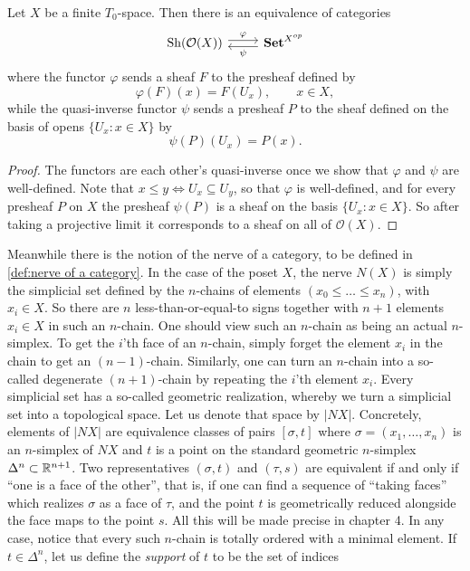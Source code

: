 \begin{theorem}
\label{thm:intro-theorem}
Let $X$ be a finite $T_0$-space. Then there is an equivalence of categories
\[ \begin{tikzcd}
\Sh(\mathcal{O}(X)) \arrow[shift left=0.25em]{r}{\varphi} & \mathbf{Set}^{X^{op}} \arrow[shift left=0.25em]{l}{\psi} \end{tikzcd} \]
where the functor $\varphi$ sends a sheaf $F$ to the presheaf defined by
\[ \varphi(F)(x) = F(U_x), \qquad x \in X, \]
while the quasi-inverse functor $\psi$ sends a presheaf $P$ to the sheaf defined on the basis of opens $\{U_x : x \in X\}$ by
\[\psi(P)(U_x) = P(x). \]
\end{theorem}
\begin{proof}
The functors are each other's quasi-inverse once we show that $\varphi$ and $\psi$ are well-defined. Note that $x \leq y \iff U_x \subseteq U_y$, so that $\varphi$ is well-defined, and for every presheaf $P$ on $X$ the presheaf $\psi(P)$ is a sheaf on the basis $\{U_x : x \in X\}$. So after taking a projective limit it corresponds to a sheaf on all of $\mathcal{O}(X)$.
\end{proof}
Meanwhile there is the notion of the nerve of a category, to be defined in \cref{def:nerve of a category}. In the case of the poset $X$, the nerve $N(X)$ is simply the simplicial set defined by the $n$-chains of elements $(x_0 \leq \ldots \leq x_n)$, with $x_i \in X$. So there are $n$ less-than-or-equal-to signs together with $n+1$ elements $x_i \in X$ in such an $n$-chain. One should view such an $n$-chain as being an actual $n$-simplex. To get the $i$'th face of an $n$-chain, simply forget the element $x_i$ in the chain to get an $(n-1)$-chain. Similarly, one can turn an $n$-chain into a so-called degenerate $(n+1)$-chain by repeating the $i$'th element $x_i$. Every simplicial set has a so-called geometric realization, whereby we turn a simplicial set into a topological space. Let us denote that space by $|NX|$. Concretely, elements of $|NX|$ are equivalence classes of pairs $[\sigma, t]$ where $\sigma = (x_1,\ldots, x_n)$ is an $n$-simplex of $NX$ and $t$ is a point on the standard geometric $n$-simplex $\Delta^n \subset \mathbb{R}^{n+1}$. Two representatives $(\sigma,t)$ and $(\tau,s)$ are equivalent if and only if ``one is a face of the other'', that is, if one can find a sequence of ``taking faces'' which realizes $\sigma$ as a face of $\tau$, and the point $t$ is geometrically reduced alongside the face maps to the point $s$. All this will be made precise in chapter 4. In any case, notice that every such $n$-chain is totally ordered with a minimal element. If $t \in \Delta^n$, let us define the \emph{support} of $t$ to be the set of indices
